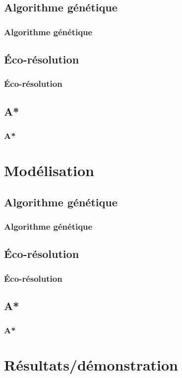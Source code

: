 \documentclass{beamer}
\begin{document}
        \subsection{Algorithme génétique}
            \begin{frame}
                \frametitle{Algorithme génétique}
            \end{frame}
        \subsection{Éco-résolution}
            \begin{frame}
                \frametitle{Éco-résolution}
            \end{frame}
        \subsection{A*}
            \begin{frame}
                \frametitle{A*}
            \end{frame}

    \section{Mod\'elisation}
        \subsection{Algorithme génétique}
            \begin{frame}
                \frametitle{Algorithme génétique}
            \end{frame}
        \subsection{Éco-résolution}
            \begin{frame}
                \frametitle{Éco-résolution}
            \end{frame}
        \subsection{A*}
            \begin{frame}
                \frametitle{A*}
            \end{frame}

    \section{R\'esultats/d\'emonstration}
\end{document}
